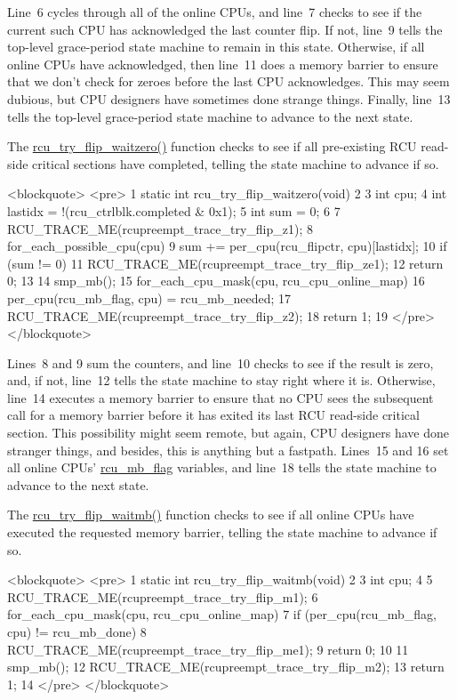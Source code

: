 Line~6 cycles through all of the online CPUs, and line~7
checks to see if the current such CPU has acknowledged the last counter
flip.
If not, line~9 tells the top-level grace-period state machine to
remain in this state.
Otherwise, if all online CPUs have acknowledged, then line~11
does a memory barrier to ensure that we don't check for zeroes before
the last CPU acknowledges.
This may seem dubious, but CPU designers have sometimes done strange
things.
Finally, line~13 tells the top-level grace-period state machine
to advance to the next state.

The \url{rcu_try_flip_waitzero()} function checks to see if
all pre-existing RCU read-side critical sections have completed,
telling the state machine to advance if so.


<blockquote>
<pre>  1 static int rcu_try_flip_waitzero(void)
  2 {
  3   int cpu;
  4   int lastidx = !(rcu_ctrlblk.completed & 0x1);
  5   int sum = 0;
  6 
  7   RCU_TRACE_ME(rcupreempt_trace_try_flip_z1);
  8   for_each_possible_cpu(cpu)
  9     sum += per_cpu(rcu_flipctr, cpu)[lastidx];
 10   if (sum != 0) {
 11     RCU_TRACE_ME(rcupreempt_trace_try_flip_ze1);
 12     return 0;
 13   }
 14   smp_mb();
 15   for_each_cpu_mask(cpu, rcu_cpu_online_map)
 16     per_cpu(rcu_mb_flag, cpu) = rcu_mb_needed;
 17   RCU_TRACE_ME(rcupreempt_trace_try_flip_z2);
 18   return 1;
 19 }
</pre>
</blockquote>


Lines~8 and 9 sum the counters, and line~10 checks
to see if the result is zero, and, if not, line~12 tells
the state machine to stay right where it is.
Otherwise, line~14 executes a memory barrier to ensure that
no CPU sees the subsequent call for a memory barrier before it
has exited its last RCU read-side critical section.
This possibility might seem remote, but again, CPU designers have
done stranger things, and besides, this is anything but a fastpath.
Lines~15 and 16 set all online CPUs' \url{rcu_mb_flag}
variables, and line~18 tells the state machine to advance to
the next state.

The \url{rcu_try_flip_waitmb()} function checks to see
if all online CPUs have executed the requested memory barrier,
telling the state machine to advance if so.


<blockquote>
<pre>  1 static int rcu_try_flip_waitmb(void)
  2 {
  3   int cpu;
  4 
  5   RCU_TRACE_ME(rcupreempt_trace_try_flip_m1);
  6   for_each_cpu_mask(cpu, rcu_cpu_online_map)
  7     if (per_cpu(rcu_mb_flag, cpu) != rcu_mb_done) {
  8       RCU_TRACE_ME(rcupreempt_trace_try_flip_me1);
  9       return 0;
 10     }
 11   smp_mb();
 12   RCU_TRACE_ME(rcupreempt_trace_try_flip_m2);
 13   return 1;
 14 }
</pre>
</blockquote>


